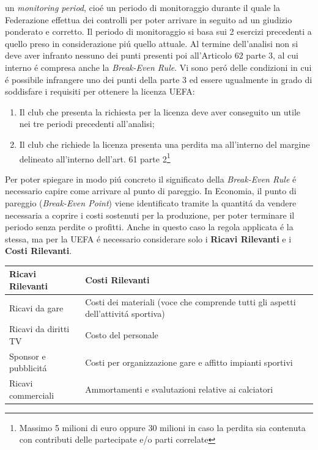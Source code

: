 \documentclass[
    corpo=12pt,
    oneside,
    evenboxes,
    tipotesi=triennale,
    stile=classica,
    oldstyle,
    autoretitolo,
    greek,
]{toptesi}
\begin{document}
\begin{interlinea}{1.5}
un \emph{monitoring period}, cio\'e un periodo di monitoraggio durante il quale la Federazione effettua dei controlli per poter arrivare in seguito 
ad un giudizio ponderato e corretto. Il periodo di monitoraggio si basa sui 2 esercizi precedenti a quello preso in considerazione pi\'u quello attuale.
Al termine dell'analisi non si deve aver infranto nessuno dei punti presenti poi all'Articolo 62 parte 3, al cui interno 
\'e compresa anche la \emph{Break-Even Rule}. Vi sono per\'o delle condizioni in cui \'e possibile infrangere uno dei punti della parte 3 
ed essere ugualmente in grado di soddisfare i requisiti per ottenere la licenza UEFA:
\begin{enumerate}
    \item Il club che presenta la richiesta per la licenza deve aver conseguito un utile nei tre periodi precedenti all'analisi;
    \item Il club che richiede la licenza presenta una perdita ma all'interno del margine delineato all'interno dell'art. 61 parte 2\footnote{Massimo 5 milioni di euro oppure 30 milioni in caso la perdita sia contenuta con contributi delle partecipate e/o parti correlate}
\end{enumerate}
Per poter spiegare in modo pi\'u concreto il significato della \emph{Break-Even Rule} \'e necessario capire come arrivare al punto di pareggio.
In Economia, il punto di pareggio (\emph{Break-Even Point}) viene identificato tramite la quantit\'a da vendere necessaria a coprire i costi 
sostenuti per la produzione, per poter terminare il periodo senza perdite o profitti. Anche in questo caso la regola applicata \'e la stessa,
ma per la UEFA \'e necessario considerare solo i \textbf{Ricavi Rilevanti} e i \textbf{Costi Rilevanti}.
\newpage
\begin{table}
    \begin{tabularx}{\textwidth}{XX}
        \toprule
        \textbf{Ricavi Rilevanti} & \textbf{Costi Rilevanti} \\
        \midrule
        Ricavi da gare & Costi dei materiali (voce che comprende tutti gli aspetti dell'attivit\'a sportiva) \\
        \midrule
        Ricavi da diritti TV & Costo del personale \\
        \midrule
        Sponsor e pubblicit\'a & Costi per organizzazione gare e affitto impianti sportivi \\
        \midrule
        Ricavi commerciali & Ammortamenti e svalutazioni relative ai calciatori \\

\end{tabularx}
\end{table}
\end{interlinea}
\end{document}
